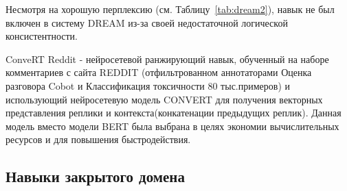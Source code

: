 Несмотря на хорошую перплексию (см. Таблицу~\ref{tab:dream2}), навык не был включен в систему {DREAM} из-за своей недостаточной логической консистентности.


\begin{table}[htbp]
\centering
\caption {Точность (перплексия) для генеративного навыка}
\label{tab:dream2}%
\end{table}



ConveRT Reddit - нейросетевой ранжирующий навык, обученный на наборе комментариев с сайта REDDIT \cite{na_website_ndu} (отфильтрованном аннотаторами Оценка разговора Cobot и Классификация токсичности 80 тыс.примеров) и использующий нейросетевую модель CONVERT \cite{henderson_2019} для получения векторных представления реплики и контекста(конкатенации предыдущих реплик). Данная модель вместо модели BERT была выбрана в целях экономии вычислительных ресурсов и для повышения быстродействия.

\subsection{Навыки закрытого домена}\label{dream:1:closed}

